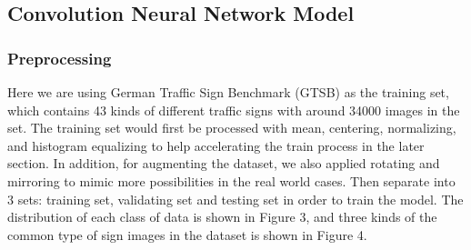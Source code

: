 \documentclass{article}
\begin{document}
\subsection{Convolution Neural Network Model}
\subsubsection{Preprocessing}
Here we are using German Traffic Sign Benchmark (GTSB) as the training set, which contains 43 kinds of different traffic signs with around 34000 images in the set. The training set would first be processed with mean, centering, normalizing, and histogram equalizing to help accelerating the train process in the later section. In addition, for augmenting the dataset, we also applied rotating and mirroring to mimic more possibilities in the real world cases. Then separate into 3 sets: training set, validating set and testing set in order to train the model. The distribution of each class of data is shown in Figure 3, and three kinds of the common type of sign images in the dataset is shown in Figure 4.
\end{document}
